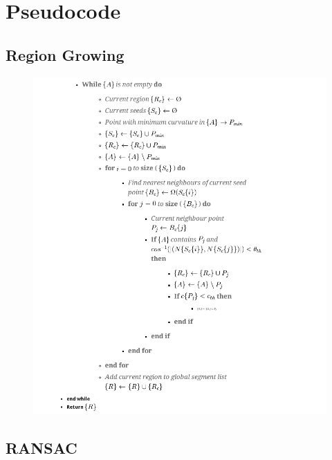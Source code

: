\appendix
\chapter{Pseudocode}
\section{Region Growing}
\begin{figure}[H]
\includegraphics[width=.9\linewidth]{Includes/images/RegionGrowingPseudocode}
\end{figure}

\section{RANSAC}

